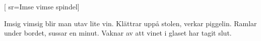 

[					%
	sr={Imse vimse spindel}]						%
	

\beginverse*						%
Imsig vimsig blir man
utav lite vin.
Klättrar uppå stolen,
verkar piggelin.
Ramlar under bordet,
sussar en minut.
Vaknar av att vinet
i glaset har tagit slut.
\endverse							%

\endsong							%